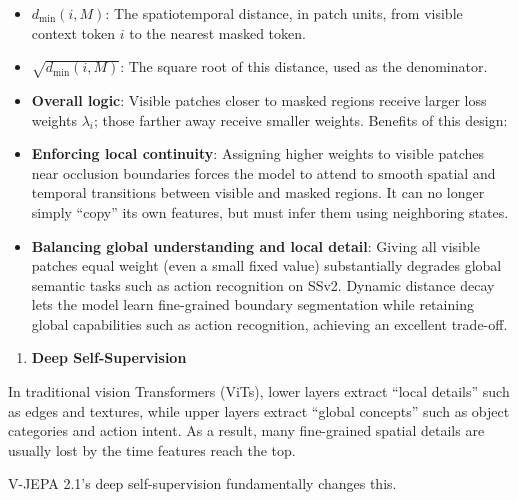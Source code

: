 \begin{itemize}
\item
  \(d_{\min}(i, M)\): The spatiotemporal distance, in patch units, from visible context token \(i\) to the nearest masked token.
\item
  \(\sqrt{d_{\min}(i, M)}\): The square root of this distance, used as the denominator.
\item
  \textbf{Overall logic}: Visible patches closer to masked regions receive larger loss weights \(\lambda_i\); those farther away receive smaller weights.
  Benefits of this design:
\item
  \textbf{Enforcing local continuity}: Assigning higher weights to visible patches near occlusion boundaries forces the model to attend to smooth spatial and temporal transitions between visible and masked regions. It can no longer simply ``copy'' its own features, but must infer them using neighboring states.
\item
  \textbf{Balancing global understanding and local detail}: Giving all visible patches equal weight (even a small fixed value) substantially degrades global semantic tasks such as action recognition on SSv2. Dynamic distance decay lets the model learn fine-grained boundary segmentation while retaining global capabilities such as action recognition, achieving an excellent trade-off.
\end{itemize}

\begin{enumerate}
\def\labelenumi{\arabic{enumi}.}
\setcounter{enumi}{2}
\tightlist
\item
  \textbf{Deep Self-Supervision}
\end{enumerate}

In traditional vision Transformers (ViTs), lower layers extract ``local details'' such as edges and textures, while upper layers extract ``global concepts'' such as object categories and action intent. As a result, many fine-grained spatial details are usually lost by the time features reach the top.

V-JEPA 2.1's deep self-supervision fundamentally changes this.

